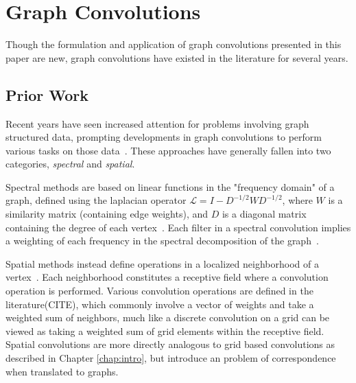 \section{Graph Convolutions}
Though the formulation and application of graph convolutions presented in this paper are new, graph convolutions have existed in the literature for several years.


\subsection{Prior Work}
Recent years have seen increased attention for problems involving graph structured data, prompting developments in graph convolutions to perform various tasks on those data~\cite{bronstein2016}.
These approaches have generally fallen into two categories, \textit{spectral} and \textit{spatial}.

Spectral methods are based on linear functions in the "frequency domain" of a graph, defined using the laplacian operator $\mathcal{L}=I-D^{-1/2}WD^{-1/2}$, where $W$ is a similarity matrix (containing edge weights), and $D$ is a diagonal matrix containing the degree of each vertex~\cite{henaff2015}.
Each filter in a spectral convolution implies a weighting of each frequency in the spectral decomposition of the graph~\cite{mallat2009}.

Spatial methods instead define operations in a localized neighborhood of a vertex~\cite{henaff2015}.
Each neighborhood constitutes a receptive field where a convolution operation is performed. 
Various convolution operations are defined in the literature(CITE), which commonly involve a vector of weights and take a weighted sum of neighbors, much like a discrete convolution on a grid can be viewed as taking a weighted sum of grid elements within the receptive field.
Spatial convolutions are more directly analogous to grid based convolutions as described in Chapter \ref{chap:intro}, but introduce an problem of correspondence when translated to graphs.

